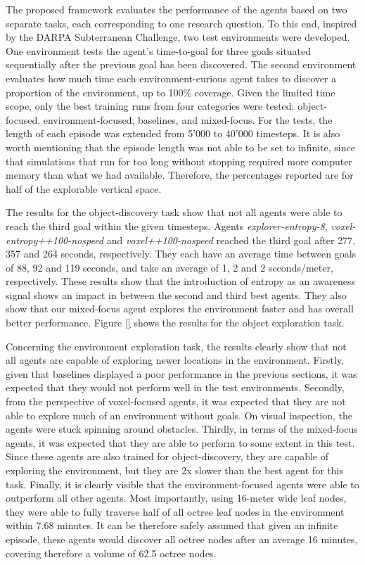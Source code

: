         The proposed framework evaluates the performance of the agents based on two separate tasks, each corresponding to one research question. To this end, inspired by the DARPA Subterranean Challenge, two test environments were developed. One environment tests the agent's time-to-goal for three goals situated sequentially after the previous goal has been discovered. The second environment evaluates how much time each environment-curious agent takes to discover a proportion of the environment, up to 100\% coverage. Given the limited time scope, only the best training runs from four categories were tested: object-focused, environment-focused, baselines, and mixed-focus. For the tests, the length of each episode was extended from 5'000 to 40'000 timesteps. It is also worth mentioning that the episode length was not able to be set to infinite, since that simulations that run for too long without stopping required more computer memory than what we had available. Therefore, the percentages reported are for half of the explorable vertical space. 
        
        The results for the object-discovery task show that not all agents were able to reach the third goal within the given timesteps. Agents \textit{explorer-entropy-8}, \textit{voxel-entropy++100-nospeed} and \textit{voxel++100-nospeed} reached the third goal after 277, 357 and 264 seconds, respectively. They each have an average time between goals of 88, 92 and 119 seconds, and take an average of 1, 2 and 2 seconds/meter, respectively.
        These results show that the introduction of entropy as an awareness signal shows an impact in between the second and third best agents. They also show that our mixed-focus agent explores the environment faster and has overall better performance. 
        Figure \ref{} shows the results for the object exploration task. 
        
        
        Concerning the environment exploration task, the results clearly show that not all agents are capable of exploring newer locations in the environment. 
        Firstly, given that baselines displayed a poor performance in the previous sections, it was expected that they would not perform well in the test environments.
        Secondly, from the perspective of voxel-focused agents, it was expected that they are not able to explore much of an environment without goals. On visual inspection, the agents were stuck spinning around obstacles. 
        Thirdly, in terms of the mixed-focus agents, it was expected that they are able to perform to some extent in this test. Since these agents are also trained for object-discovery, they are capable of exploring the environment, but they are 2x slower than the best agent for this task.
        Finally, it is clearly visible that the environment-focused agents were able to outperform all other agents. Most importantly, using 16-meter wide leaf nodes, they were able to fully traverse half of all octree leaf nodes in the environment within 7.68 minutes. It can be therefore safely assumed that given an infinite episode, these agents would discover all octree nodes after an average 16 minutes, covering therefore a volume of 62.5 octree nodes.
        
